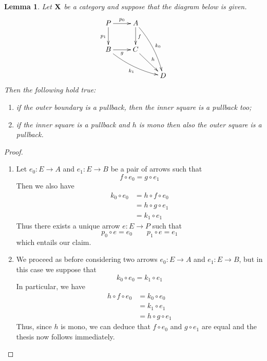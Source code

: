 \documentclass[a4paper]{article}
\def\X{\textbf {\textup{X}}}
\newtheorem{lemma}[theorem]{Lemma}
\theoremstyle{definition}
\begin{document}
\begin{lemma}\label{lem:pushandpullpb}
	Let $\X$ be a category and suppose that the diagram below is given.
	\[\xymatrix{ P \ar[r]^{p_0} \ar[d]_{p_1}& A  \ar@/^.2cm/[ddr]^{k_0}\ar[d]^{f}\\  B  \ar@/_.2cm/[drr]_{k_1} \ar[r]_g & C \ar[dr]^{h}\\&& D }\]
	Then the following hold true:
	\begin{enumerate}
		\item if the outer boundary is a pullback, then the inner square is a pullback too;
		\item if the inner square is a pullback and $h$ is mono then also the outer square is a pullback.
	\end{enumerate}
\end{lemma}
\begin{proof}\begin{enumerate}
		\item Let $e_0\colon E\to A$ and $e_1\colon E\to B$ be a pair of arrows such that 
		\[f\circ e_0=g\circ e_1\]
		Then we also have 
		\begin{align*}
		k_0\circ e_0 &= h\circ f\circ e_0\\&=h\circ g \circ e_1\\&=k_1\circ e_1
		\end{align*}
		Thus there exists a unique arrow $e\colon E\to P$ such that
		\[p_0\circ e= e_0 \qquad p_1\circ e=e_1\]
		which entails our claim.
		\item We proceed as before considering two arrows $e_0\colon E\to A$ and $e_1\colon E\to B$, but in this case we suppose that 
		\[k_0\circ e_0=k_1\circ e_1\]
		In particular, we have
		\begin{align*}
			h\circ f \circ e_0 &= k_0\circ e_0\\&=k_1\circ e_1\\&=h\circ g\circ e_1
		\end{align*}
		Thus, since $h$ is mono, we can deduce that $f\circ e_0$ and $g\circ e_1$ are equal and the thesis now follows immediately.
		\qedhere 
	\end{enumerate}
	\end{proof} 
	
\end{document}
